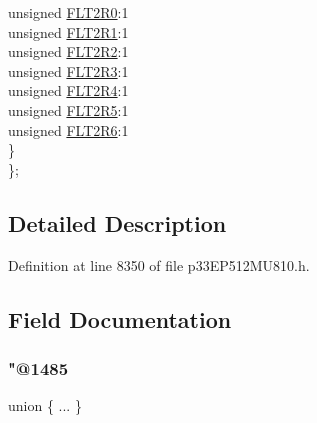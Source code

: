 \begin{DoxyCompactItemize}
\begin{tabbing}
\>\>unsigned \hyperlink{structtag_r_p_i_n_r12_b_i_t_s_ac7a34bcb28cef9e7e7c05e1c480c8661}{FLT2R0}:1\\
\>\>unsigned \hyperlink{structtag_r_p_i_n_r12_b_i_t_s_a9d03aff5f782075a806a2dfd54e2d57a}{FLT2R1}:1\\
\>\>unsigned \hyperlink{structtag_r_p_i_n_r12_b_i_t_s_a31f204bb173380e9c06a2f4bda0c86ed}{FLT2R2}:1\\
\>\>unsigned \hyperlink{structtag_r_p_i_n_r12_b_i_t_s_a7583442acdd1d16feaaf770be0ad2e33}{FLT2R3}:1\\
\>\>unsigned \hyperlink{structtag_r_p_i_n_r12_b_i_t_s_ada5a9ce0a065eef4325bfc4bb6bbffff}{FLT2R4}:1\\
\>\>unsigned \hyperlink{structtag_r_p_i_n_r12_b_i_t_s_a38235fd1dc5652223dd91768e657b925}{FLT2R5}:1\\
\>\>unsigned \hyperlink{structtag_r_p_i_n_r12_b_i_t_s_a01cbb2c5ce422bacb10c9520ab906648}{FLT2R6}:1\\
\>\} \\
\}; \\

\end{tabbing}\end{DoxyCompactItemize}


\subsection{Detailed Description}


Definition at line 8350 of file p33\+E\+P512\+M\+U810.\+h.



\subsection{Field Documentation}
\mbox{\label{structtag_r_p_i_n_r12_b_i_t_s_a311f523cf423dc5bacc4a0e5a586d1d3}} 
\subsubsection{\texorpdfstring{"@1485}{@1485}}
{\footnotesize\ttfamily union \{ ... \} }

\mbox{\label{structtag_r_p_i_n_r12_b_i_t_s_adf71f3d8410c1f1dbbc96680a92c49af}} 

